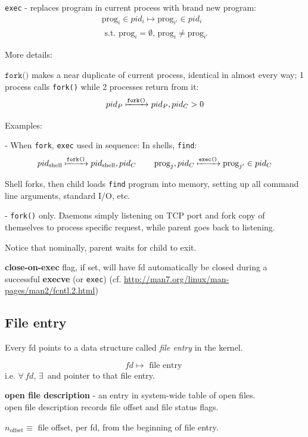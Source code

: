 \documentclass[10pt]{amsart}
\begin{document}
\begin{multicols*}{2}
\texttt{exec} - replaces program in current process with brand new program:
\[
\begin{gathered}
\text{prog}_i \in pid_i \mapsto \text{prog}_{i'} \in pid_i \\
\text{ s.t. } \text{prog}_i = \emptyset, \, \text{prog}_i \neq \text{prog}_{i'}
\end{gathered}
\]

More details:

$\texttt{fork()}$ makes a near duplicate of current process, identical in almost every way; 1 process calls \texttt{fork()} while 2 processes return from it:
\[
pid_P \xmapsto{\texttt{fork()}} pid_P, pid_C >0
\]

Examples:

- When \texttt{fork}, \texttt{exec} used in sequence: 
In shells, \texttt{find}: 
\[
pid_{\text{shell}} \xmapsto{\texttt{fork()}} pid_{\text{shell}}, pid_C \qquad \, \text{prog}_j, pid_C \xmapsto{\texttt{exec()}} \text{prog}_{j'} \in pid_C
\] 

Shell forks, then child loads \texttt{find} program into memory, setting up all command line arguments, standard I/O, etc.

- \texttt{fork()} only.
Daemons simply listening on TCP port and fork copy of themselves to process specific request, while parent goes back to listening. 

Notice that nominally, parent waits for child to exit. 

\textbf{close-on-exec} flag, if set, will have fd automatically be closed during a successful \textbf{execve} (or \texttt{exec}) (cf. \url{http://man7.org/linux/man-pages/man2/fcntl.2.html})

\subsection{File entry}

Every fd points to a data structure called \emph{file entry} in the kernel.

\[
fd \mapsto \text{ file entry }
\]
i.e. $\forall \, fd$, $\exists \,$  and pointer to that file entry.


\textbf{open file description} - an entry in system-wide table of open files. \\
open file description records file offset and file status flags.

$n_{\text{offset}} \equiv $ file offset, per fd, from the beginning of file entry.


\end{multicols*}
\end{document}
